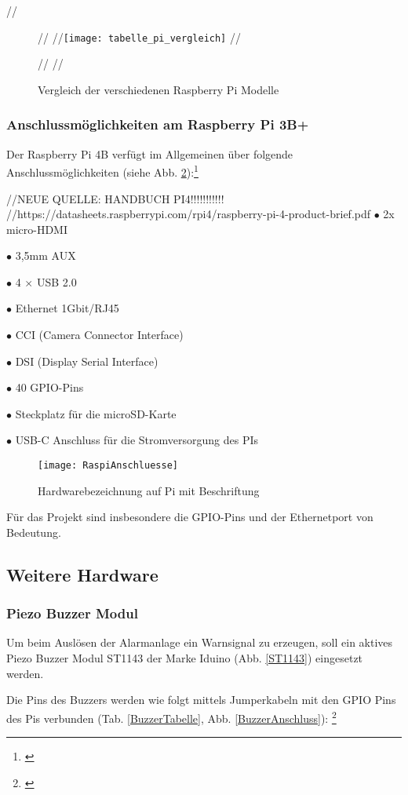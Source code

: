 	// \begin{figure}[H]
	// \centering
	//\texttt{[image: tabelle\_pi\_vergleich]}
	//\caption{Vergleich der verschiedenen Raspberry Pi Modelle \protect\cite[S. 59]{Huwe.2019}}
	// \label{tabelle_pi_vergleich}
// \end{figure}

\subsubsection{Anschlussmöglichkeiten am Raspberry Pi 3B+}
Der Raspberry Pi 4B verfügt im Allgemeinen über folgende Anschlussmöglichkeiten (siehe Abb. \ref{RaspiAnschluesse}):\footnote{\cite[S. 60]{Huwe.2019}}\par  
//NEUE QUELLE: HANDBUCH PI4!!!!!!!!!!!  //https://datasheets.raspberrypi.com/rpi4/raspberry-pi-4-product-brief.pdf
$\bullet$ 2x micro-HDMI   \par %
$\bullet$ 3,5mm AUX\par 
$\bullet$ 4 $\times$ USB 2.0 \par 
$\bullet$ Ethernet 1Gbit/RJ45\par 
$\bullet$ CCI (Camera Connector Interface)\par 
$\bullet$ DSI (Display Serial Interface)\par
$\bullet$ 40 GPIO-Pins\par
$\bullet$ Steckplatz für die microSD-Karte\par
$\bullet$ USB-C Anschluss für die Stromversorgung des PIs\par

	\begin{figure}[H]
		\centering
		\texttt{[image: RaspiAnschluesse]}
		\caption{Hardwarebezeichnung auf Pi mit Beschriftung \cite{notebooksbilliger.deAG.21.04.2022}}
		\label{RaspiAnschluesse}
	\end{figure}
	
Für das Projekt sind insbesondere die GPIO-Pins und der Ethernetport von Bedeutung.\par

\newpage

\subsection{Weitere Hardware}
\subsubsection{Piezo Buzzer Modul}
	Um beim Auslösen der Alarmanlage ein Warnsignal zu erzeugen, soll ein aktives Piezo Buzzer Modul ST1143 der Marke Iduino (Abb. \ref{ST1143}) eingesetzt werden.\par Die Pins des Buzzers werden wie folgt mittels Jumperkabeln mit den GPIO Pins des Pis verbunden (Tab. \ref{BuzzerTabelle}, Abb. \ref{BuzzerAnschluss}): \footnote{\cite{Draeger.2019}}
	
